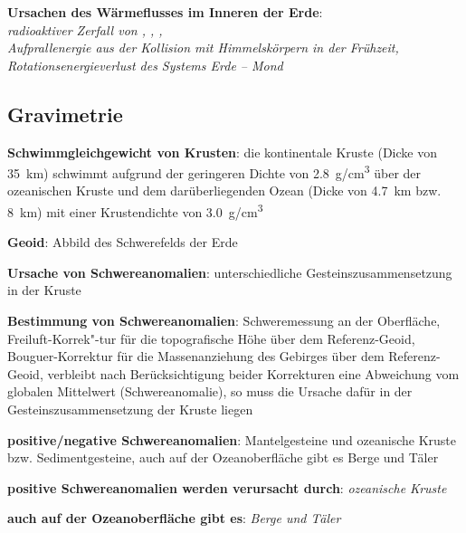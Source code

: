 \begin{wichtig}
    \item
    \textbf{Ursachen des Wärmeflusses im Inneren der Erde}:\\
    \emph{radioaktiver Zerfall von , , ,\\
    Aufprallenergie aus der Kollision mit Himmelskörpern in der Frühzeit,\\
    Rotationsenergieverlust des Systems Erde -- Mond}
\end{wichtig}

\subsection{%
    Gravimetrie%
}

\textbf{Schwimmgleichgewicht von Krusten}:
die kontinentale Kruste (Dicke von \SI{35}{\kilo\meter}) schwimmt aufgrund der geringeren
Dichte von \SI{2.8}{\gram/\centi\meter\cubed} über der ozeanischen Kruste und dem
darüberliegenden Ozean (Dicke von \SI{4.7}{\kilo\meter} bzw. \SI{8}{\kilo\meter})
mit einer Krustendichte von \SI{3.0}{\gram/\centi\meter\cubed}

\textbf{Geoid}:
Abbild des Schwerefelds der Erde

\textbf{Ursache von Schwereanomalien}:
unterschiedliche Gesteinszusammensetzung in der Kruste

\textbf{Bestimmung von Schwereanomalien}:
Schweremessung an der Oberfläche,
Freiluft-Korrek"-tur für die topografische Höhe über dem Referenz-Geoid,
Bouguer-Korrektur für die Massenanziehung des Gebirges über dem Referenz-Geoid,
verbleibt nach Berücksichtigung beider Korrekturen eine Abweichung vom globalen Mittelwert
(Schwereanomalie), so muss die Ursache dafür in der Gesteinszusammensetzung der Kruste liegen

\textbf{positive/negative Schwereanomalien}:
Mantelgesteine und ozeanische Kruste bzw. Sedimentgesteine,
auch auf der Ozeanoberfläche gibt es Berge und Täler

\begin{wichtig}
    \item
    \textbf{positive Schwereanomalien werden verursacht durch}:
    \emph{ozeanische Kruste}
    
    \item
    \textbf{auch auf der Ozeanoberfläche gibt es}:
    \emph{Berge und Täler}
\end{wichtig}

\pagebreak

